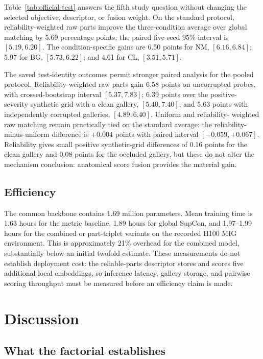 \documentclass[runningheads]{llncs}
\begin{document}
Table~\ref{tab:official-test} answers the fifth study question without changing
the selected objective, descriptor, or fusion weight. On the standard protocol,
reliability-weighted raw parts improve the three-condition average over global
matching by 5.69 percentage points; the paired five-seed 95\% interval is
$[5.19,6.20]$. The condition-specific gains are 6.50 points for NM,
$[6.16,6.84]$; 5.97 for BG, $[5.73,6.22]$; and 4.61 for CL,
$[3.51,5.71]$.

The saved test-identity outcomes permit stronger paired analysis for the pooled
protocol. Reliability-weighted raw parts gain 6.58 points on uncorrupted probes,
with crossed-bootstrap interval $[5.37,7.83]$; 6.39 points over the positive-
severity synthetic grid with a clean gallery, $[5.40,7.40]$; and 5.63 points
with independently corrupted galleries, $[4.89,6.40]$. Uniform and reliability-
weighted raw matching remain practically tied on the standard average: the
reliability-minus-uniform difference is $+0.004$ points with paired interval
$[-0.059,+0.067]$. Reliability gives small positive synthetic-grid differences
of 0.16 points for the clean gallery and 0.08 points for the occluded gallery,
but these do not alter the mechanism conclusion: anatomical score fusion
provides the material gain.

\subsection{Efficiency}

The common backbone contains 1.69 million parameters. Mean training time is
1.63 hours for the metric baseline, 1.89 hours for global SupCon, and
1.97--1.99 hours for the combined or part-triplet variants on the recorded H100
MIG environment. This is approximately 21\% overhead for the combined model,
substantially below an initial twofold estimate. These measurements do
not establish deployment cost: the reliable-parts descriptor stores and scores
five additional local embeddings, so inference latency, gallery storage, and
pairwise scoring throughput must be measured before an efficiency claim is
made.

\section{Discussion}

\subsection{What the factorial establishes}
\end{document}
